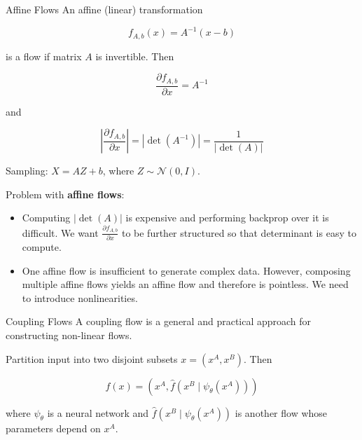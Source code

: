 \begin{frame}[allowframebreaks]

\begin{mydefinitionblock}{10.21}{Affine Flows}
    An affine (linear) transformation

    $$
    f_{A, b}(x)=A^{-1}(x-b)
    $$

    is a flow if matrix $A$ is invertible. Then

    $$
    \frac{\partial f_{A, b}}{\partial x}=A^{-1}
    $$

    and

    $$
    \left|\frac{\partial f_{A, b}}{\partial x}\right|=\left|\operatorname{det}\left(A^{-1}\right)\right|=\frac{1}{|\operatorname{det}(A)|}
    $$

    Sampling: $X=A Z+b$, where $Z \sim \mathcal{N}(0, I)$.

    Problem with \textbf{affine flows}:

    \begin{itemize}
        \item Computing $|\operatorname{det}(A)|$ is expensive and performing backprop over it is difficult. We want $\frac{\partial f_{A, b}}{\partial x}$ to be further structured so that determinant is easy to compute.
        \item One affine flow is insufficient to generate complex data. However, composing multiple affine flows yields an affine flow and therefore is pointless. We need to introduce nonlinearities.
    \end{itemize}
\end{mydefinitionblock}

\end{frame}


\begin{frame}[allowframebreaks]

\par\noindent\textcolor{gray}{\hdashrule{\textwidth}{0.4pt}{1pt 2pt}}

\end{frame}

\begin{frame}[allowframebreaks]

\begin{mydefinitionblock}{10.22}{Coupling Flows}
    A coupling flow is a general and practical approach for constructing non-linear flows.

    Partition input into two disjoint subsets $x=\left(x^{A}, x^{B}\right)$. Then

    $$
    f(x)=\left(x^{A}, \hat{f}\left(x^{B} \mid \psi_{\theta}\left(x^{A}\right)\right)\right)
    $$

    where $\psi_{\theta}$ is a neural network and $\hat{f}\left(x^{B} \mid \psi_{\theta}\left(x^{A}\right)\right)$ is another flow whose parameters depend on $x^{A}$.
\end{mydefinitionblock}

\end{frame}

